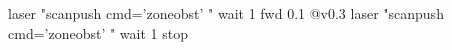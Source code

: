 

laser "scanpush cmd='zoneobst' "
wait 1
fwd 0.1 @v0.3
laser "scanpush cmd='zoneobst' "
wait 1
stop